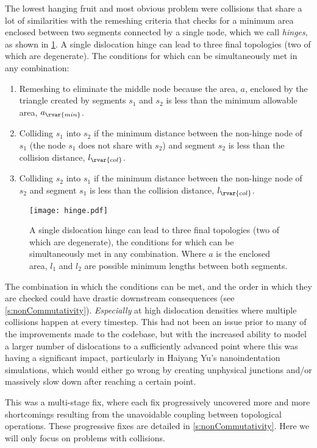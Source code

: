 The lowest hanging fruit and most obvious problem were collisions that share a lot of similarities with the remeshing criteria that checks for a minimum area enclosed between two segments connected by a single node, which we call \emph{hinges}, as shown in \cref{f:hinge}. A single dislocation hinge can lead to three final topologies (two of which are degenerate). The conditions for which can be simultaneously met in any combination:
\begin{enumerate}
    \item Remeshing to eliminate the middle node because the area, $a$, enclosed by the triangle created by segments $s_1$ and $s_2$ is less than the minimum allowable area, $a_{\rvar{min}}$.
    \item Colliding $s_1$ into $s_2$ if the minimum distance between the non-hinge node of $s_1$ (the node $s_1$ does not share with $s_2$) and segment $s_2$ is less than the collision distance, $l_{\rvar{col}}$.
    \item Colliding $s_2$ into $s_1$ if the minimum distance between the non-hinge node of $s_2$ and segment $s_1$ is less than the collision distance, $l_{\rvar{col}}$.
\end{enumerate}
\begin{figure}
    \centering
    \texttt{[image: hinge.pdf]}
    \caption[A single dislocation hinge can lead to three different final topologies.]{A single dislocation hinge can lead to three final topologies (two of which are degenerate), the conditions for which can be simultaneously met in any combination. Where $a$ is the enclosed area, $l_1$ and $l_2$ are possible minimum lengths between both segments.}
    \label{f:hinge}
\end{figure}

The combination in which the conditions can be met, and the order in which they are checked could have drastic downstream consequences (see \cref{s:nonCommutativity}). \emph{Especially} at high dislocation densities where multiple collisions happen at every timestep. This had not been an issue prior to many of the improvements made to the codebase, but with the increased ability to model a larger number of dislocations to a sufficiently advanced point where this was having a significant impact, particularly in Haiyang Yu's nanoindentation simulations, which would either go wrong by creating unphysical junctions and/or massively slow down after reaching a certain point.

This was a multi-stage fix, where each fix progressively uncovered more and more shortcomings resulting from the unavoidable coupling between topological operations. These progressive fixes are detailed in \cref{s:nonCommutativity}. Here we will only focus on problems with collisions.

